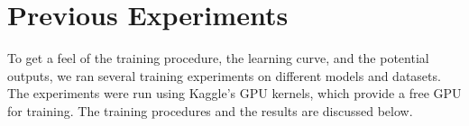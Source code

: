 \begingroup
\let\clearpage\relax
\section{Previous Experiments}
\label{sec:experiments}
To get a feel of the training procedure, the learning curve, and the potential outputs, we ran several training experiments on different models and datasets.
The experiments were run using Kaggle's GPU kernels, which provide a free GPU for training. The training procedures and the results are discussed below.





\endgroup